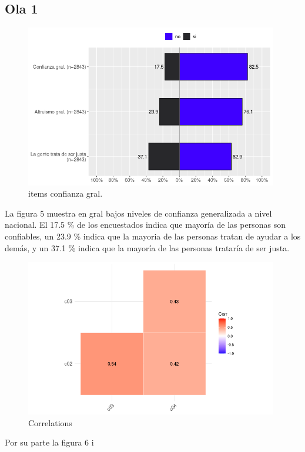 \subsection{Ola 1}

\begin{figure}[H]
    \centering
    \includegraphics[width=11cm]{output/conf_fact1.png}
    \caption{items confianza gral.}
    \label{fig:conf1}
\end{figure}

La figura 5 muestra en gral bajos niveles de confianza generalizada a nivel nacional. El 17.5 \% de los encuestados indica que mayoría de las personas son confiables, un 23.9 \% indica que la mayoria de las personas tratan de ayudar a los demás, y un 37.1 \% indica que la mayoría de las personas trataría de ser justa. 


\begin{figure}[H]
    \centering
    \includegraphics[width=11cm]{output/corrplot1.png}
    \caption{Correlations}
    \label{fig:corr1}
\end{figure}

Por su parte la figura 6 i


